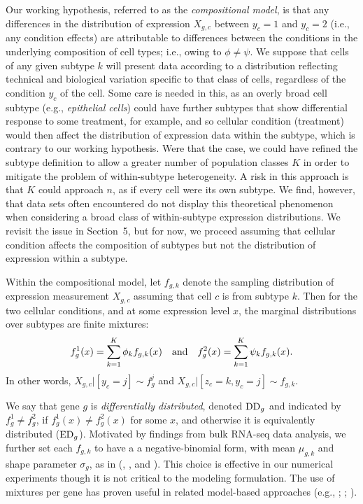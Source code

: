 \documentclass[aoas,preprint]{imsart}
\begin{document}
Our working hypothesis, referred to as the {\em compositional model},  is that any differences in the distribution of expression $X_{g,c}$ 
between $y_c=1$ and $y_c=2$ (i.e., any condition effects) are attributable 
to differences between the conditions 
in the underlying composition of cell types; i.e.,
owing to $\phi \neq \psi$.  We suppose that cells of any given subtype $k$ will
present data according to a distribution reflecting technical 
and biological variation specific to that class of cells, regardless of the 
condition $y_c$ of the cell.   Some care is needed in this, as an overly
broad cell subtype (e.g., {\em epithelial cells}) could have
further subtypes that show differential response to some treatment, for example,
and so cellular condition (treatment) would then affect the distribution of 
expression data within the subtype, which is contrary to our working hypothesis.
Were that the case,  we could have refined the subtype definition to allow a greater
number of population classes $K$ in order to mitigate the problem of within-subtype 
heterogeneity. A  risk in this approach is that $K$ could approach $n$, as if  
every cell were  its own subtype.  We find, however,
that data sets often encountered do not display this theoretical phenomenon
when considering a broad class of within-subtype expression distributions.
We revisit the issue in Section~5, but for now, we proceed assuming 
that cellular condition affects the composition of subtypes but not the distribution of expression
within a subtype.

Within the compositional model, let $f_{g,k}$ denote the sampling distribution
of expression measurement $X_{g,c}$ assuming that cell $c$ is from subtype $k$.
Then for the two cellular conditions, and at some expression level $x$, 
the marginal distributions over subtypes are finite mixtures:
\begin{eqnarray*}
f_g^1(x) = \sum_{k=1}^K \phi_k f_{g,k} (x) \quad {\mbox {\rm and}} \quad
f_g^2(x) = \sum_{k=1}^K \psi_k f_{g,k} (x).
\end{eqnarray*}
In other words,  $X_{g,c} |[ y_c=j]  \sim f_g^j$  and $X_{g,c} |[ z_c=k, y_c=j] \sim f_{g,k}$.

We say that gene $g$ is {\em differentially distributed}, denoted ${\rm DD}_g$ and indicated
by $f_g^1 \neq f_g^2$,
if $f_g^1(x) \neq f_g^2(x)$ for some $x$, and otherwise it is equivalently distributed
(${\rm ED}_g$). Motivated by findings from bulk RNA-seq data analysis, we further
set each $f_{g,k}$ to have a a negative-binomial form, with mean $\mu_{g,k}$
and shape parameter $\sigma_g$, as in  (\cite{ref:Leng}, \cite{DES}, \cite{ref:Des} and \cite{Chen:2018aa}). 
This choice is effective in our numerical experiments though it is 
not critical to the modeling formulation.  The use of mixtures per gene has proven
useful in related model-based approaches (e.g., 
\cite{ref:MAST}; \cite{McDavid:2014aa}; \cite{Huang:2018aa}).
\end{document}
